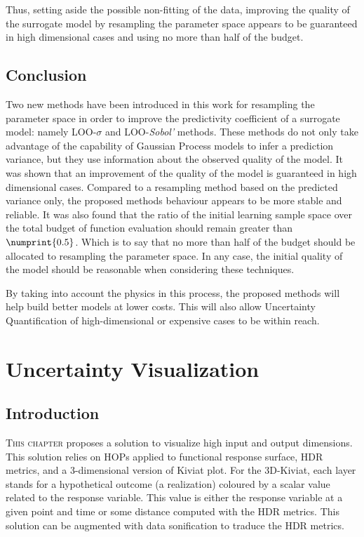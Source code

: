 Thus, setting aside the possible non-fitting of the data, improving the quality of the surrogate model by resampling the parameter space appears to be guaranteed in high dimensional cases and using no more than half of the budget.


\section{Conclusion}

Two new methods have been introduced in this work for resampling the parameter space in order to improve the predictivity coefficient of a surrogate model: namely LOO-$\sigma$ and LOO-\textit{Sobol'} methods. These methods do not only take advantage of the capability of Gaussian Process models to infer a prediction variance, but they use information about the observed quality of the model. It was shown that an improvement of the quality of the model is guaranteed in high dimensional cases. Compared to a resampling method based on the predicted variance only, the proposed methods behaviour appears to be more stable and reliable. It was also found that the ratio of the initial learning sample space over the total budget of function evaluation should remain greater than $\numprint{0.5}$. Which is to say that no more than half of the budget should be allocated to resampling the parameter space. In any case, the initial quality of the model should be reasonable when considering these techniques.

By taking into account the physics in this process, the proposed methods will help build better models at lower costs. This will also allow Uncertainty Quantification of high-dimensional or expensive cases to be within reach.

\chapter{Uncertainty Visualization}\label{chap:visu}

\section{Introduction}

\lettrine{T}{his chapter} proposes a solution to visualize high input and output dimensions. This solution relies on HOPs applied to functional response surface, HDR metrics,  and a 3-dimensional version of Kiviat plot. For the 3D-Kiviat, each layer stands for a hypothetical outcome (a realization) coloured by a scalar value related to the response variable. This value is either the response variable at a given point and time or some distance computed with the HDR metrics. This solution can be augmented with data sonification to traduce the HDR metrics.

